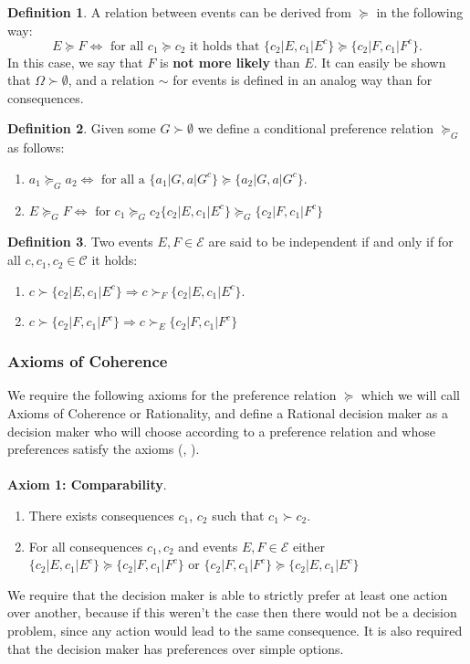 \documentclass[english,letterpaper,12pt,final]{article}
\theoremstyle{definition}
\newtheorem{defi}{Definition}[section]
\begin{document}
	\begin{defi}{\label{more_likely}}
	A relation between events can be derived from $\succeq$ in the following way:
	\[E \succeq F \Leftrightarrow \textrm{ for all } c_1 \succeq c_2 \textrm{ it holds that } \{ c_2 | E, c_1 | E^c \} \succeq \{ c_2 | F, c_1 | F^c \}. \]
	In this case, we say that $F$ is \textbf{not more likely} than $E$. It can easily be shown that $\Omega \succ \emptyset$, and a relation $\sim$ for events is defined in an analog way than for consequences.
	\end{defi}
	\begin{defi}{\label{cond_pref}}
	Given some $G \succ \emptyset$ we define a conditional preference relation $\succeq_G$ as follows:
	\begin{enumerate}[label=(\roman*)]
	\item $a_1 \succeq_G a_2 \Leftrightarrow \textrm{ for all a } \{ a_1 | G, a | G^c \} \succeq \{ a_2 | G, a | G^c \}$.
	\item $E \succeq_G F \Leftrightarrow \textrm{ for } c_1 \succeq_G c_2 \{ c_2 | E , c_1 | E^c \} \succeq_G \{c_2 | F , c_1  | F^c \}$ 
	\end{enumerate}
	\end{defi}
	\begin{defi}
	Two events $E,F \in \mathcal{E}$ are said to be independent if and only if for all $c, c_1, c_2 \in \mathcal{C}$ it holds:
	\begin{enumerate}[label=(\roman*)]
	\item $c \succ \{ c_2 | E, c_1 | E^c \} \Rightarrow c \succ_F \{ c_2 | E, c_1 | E^c \}	$.
	\item $c \succ \{ c_2 | F, c_1 | F^c \} \Rightarrow c \succ_E \{ c_2 | F, c_1 | F^c \}	$
	\end{enumerate}
	\end{defi}
	\subsubsection{Axioms of Coherence}
	We require the following axioms for the preference relation $\succeq$ which we will call Axioms of Coherence or Rationality, and define a Rational decision maker as a decision maker who will choose according to a preference relation and whose preferences satisfy the axioms (\cite{bernardo2000bayesian}, \cite{gilboa2009decision}).\\
	\\
	\indent \textbf{Axiom 1: Comparability}.
	\begin{enumerate}[label=(\roman*)]
	\item There exists consequences $c_1$, $c_2$ such that $c_1 \succ c_2$.
	\item For all consequences $c_1, c_2$ and events $E,F \in \mathcal{E}$ either $\{  c_2 | E , c_1 | E^c\} \succeq \{ c_2 | F, c_1 | F^c \}$ or $\{ c_2 | F, c_1 | F^c \} \succeq \{  c_2 | E , c_1 | E^c\}$
	\end{enumerate}
	We require that the decision maker is able to strictly prefer at least one action over another, because if this weren't the case then there would not be a decision problem, since any action would lead to the same consequence. It is also required that the decision maker has preferences over simple options.
	
\end{document}
